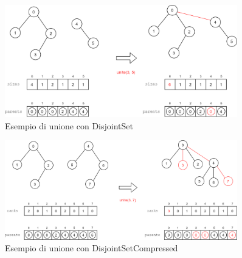 \begin{figure}[h]
	\centering
	\includegraphics[width=0.9\textwidth]{./images/DisjointSetExample.png}
	\caption{Esempio di unione con DisjointSet}
	\label{fig:disjoint-set-union-example}
\end{figure}

\begin{figure}[h]
	\centering
	\includegraphics[width=0.9\textwidth]{./images/DisjointSetCompressedExample.png}
	\caption{Esempio di unione con DisjointSetCompressed}
	\label{fig:disjoint-set-compressed-union-example}
\end{figure}
